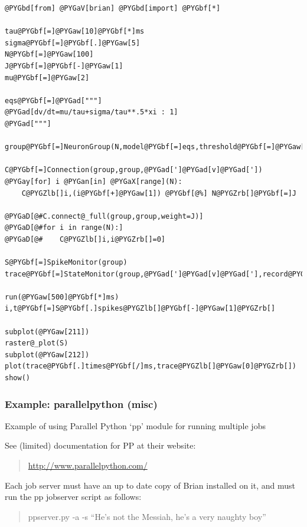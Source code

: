 \documentclass[letterpaper,10pt,english]{manual}
\begin{document}
\begin{Verbatim}[commandchars=@\[\]]
@PYGbd[from] @PYGaV[brian] @PYGbd[import] @PYGbf[*]

tau@PYGbf[=]@PYGaw[10]@PYGbf[*]ms
sigma@PYGbf[=]@PYGbf[.]@PYGaw[5]
N@PYGbf[=]@PYGaw[100]
J@PYGbf[=]@PYGbf[-]@PYGaw[1]
mu@PYGbf[=]@PYGaw[2]

eqs@PYGbf[=]@PYGad["""]
@PYGad[dv/dt=mu/tau+sigma/tau**.5*xi : 1]
@PYGad["""]

group@PYGbf[=]NeuronGroup(N,model@PYGbf[=]eqs,threshold@PYGbf[=]@PYGaw[1],reset@PYGbf[=]@PYGaw[0])

C@PYGbf[=]Connection(group,group,@PYGad[']@PYGad[v]@PYGad['])
@PYGay[for] i @PYGan[in] @PYGaX[range](N):
    C@PYGZlb[]i,(i@PYGbf[+]@PYGaw[1]) @PYGbf[@%] N@PYGZrb[]@PYGbf[=]J

@PYGaD[@#C.connect@_full(group,group,weight=J)]
@PYGaD[@#for i in range(N):]
@PYGaD[@#    C@PYGZlb[]i,i@PYGZrb[]=0]

S@PYGbf[=]SpikeMonitor(group)
trace@PYGbf[=]StateMonitor(group,@PYGad[']@PYGad[v]@PYGad['],record@PYGbf[=]@PYGaA[True])

run(@PYGaw[500]@PYGbf[*]ms)
i,t@PYGbf[=]S@PYGbf[.]spikes@PYGZlb[]@PYGbf[-]@PYGaw[1]@PYGZrb[]

subplot(@PYGaw[211])
raster@_plot(S)
subplot(@PYGaw[212])
plot(trace@PYGbf[.]times@PYGbf[/]ms,trace@PYGZlb[]@PYGaw[0]@PYGZrb[])
show()
\end{Verbatim}

\resetcurrentobjects
\hypertarget{--doc-examples-misc_parallelpython}{}

\hypertarget{index-74}{}\subsubsection{Example: parallelpython (misc)}

Example of using Parallel Python `pp' module for running multiple jobs

See (limited) documentation for PP at their website:
\begin{quote}

\href{http://www.parallelpython.com/}{http://www.parallelpython.com/}
\end{quote}

Each job server must have an up to date copy of Brian installed on it, and
must run the pp jobserver script as follows:
\begin{quote}

ppserver.py -a -s ``He's not the Messiah, he's a very naughty boy''
\end{quote}
\end{document}
